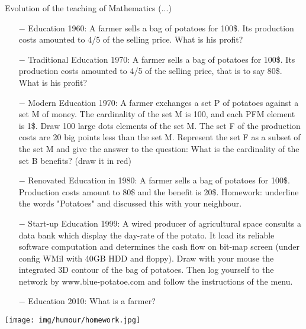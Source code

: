 	\pagebreak
Evolution of the teaching of Mathematics (...)

\begin{itemize}	 
	\item[$-$] Education 1960: A farmer sells a bag of potatoes for 100\$. Its production costs amounted to 4/5 of the selling price. What is his profit?

	\item[$-$] Traditional Education 1970: A farmer sells a bag of potatoes for 100\$. Its production costs amounted to 4/5 of the selling price, that is to say 80\$. What is his profit?

	\item[$-$] Modern Education 1970: A farmer exchanges a set P of potatoes against a set M of money. The cardinality of the set M is 100, and each PFM element is 1\$. Draw 100 large dots elements of the set M. The set F of the production costs are 20 big points less than the set M. Represent the set F as a subset of the set M and give the answer to the question: What is the cardinality of the set B benefits? (draw it in red)

	\item[$-$] Renovated Education in 1980: A farmer sells a bag of potatoes for 100\$. Production costs amount to 80\$ and the benefit is 20\$. Homework: underline the words "Potatoes" and discussed this with your neighbour.

	\item[$-$] Start-up Education 1999: A wired producer of agricultural space consults a data bank which
display the day-rate of the potato. It load its reliable software computation and determines the cash flow on bit-map screen (under config WMil with 40GB HDD and floppy). Draw with your mouse the integrated 3D contour of the bag of potatoes. Then log yourself to the network by www.blue-potatoe.com and follow the instructions of the menu.

	\item[$-$] Education 2010: What is a farmer?

\end{itemize}
	\begin{center}\underline{\hspace{5 cm}}\end{center}
	\begin{center}
		\texttt{[image: img/humour/homework.jpg]}	
	\end{center}

